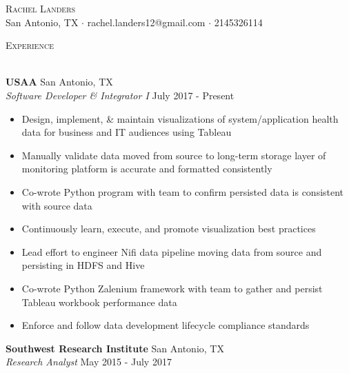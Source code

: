 \documentclass[a4paper]{article}
\newcommand{\lineunder} {
    \vspace*{-8pt} \\
    \hspace*{-18pt} \hrulefill \\
}
\newcommand{\header} [1] {
    {\hspace*{-18pt}\vspace*{6pt} \textsc{#1}}
    \vspace*{-6pt} \lineunder
}
\begin{document}
\vspace*{-40pt}

    

\vspace*{-10pt}
\begin{center}
	{\Huge \scshape {Rachel Landers}}\\
	San Antonio, TX $\cdot$ rachel.landers12@gmail.com $\cdot$ 2145326114\\
\end{center}

\header{Experience}
\vspace{1mm}

\textbf{USAA} \hfill San Antonio, TX\\
\textit{Software Developer \& Integrator I} \hfill July 2017 - Present\\
\vspace{-1mm}
\begin{itemize} \itemsep 1pt
        \item Design, implement, \& maintain visualizations of system/application health data for business and IT audiences using Tableau
        \item Manually validate data moved from source to long-term storage layer of monitoring platform is accurate and formatted consistently
        \item Co-wrote Python program with team to confirm persisted data is consistent with source data
        \item Continuously learn, execute, and promote visualization best practices
        \item Lead effort to engineer Nifi data pipeline moving data from source and persisting in HDFS and Hive
        \item Co-wrote Python Zalenium framework with team to gather and persist Tableau workbook performance data
        \item Enforce and follow data development lifecycle compliance standards
\end{itemize}
\textbf{Southwest Research Institute} \hfill San Antonio, TX\\
\textit{Research Analyst} \hfill May 2015 - July 2017\\
\vspace{-1mm}
\end{document}
